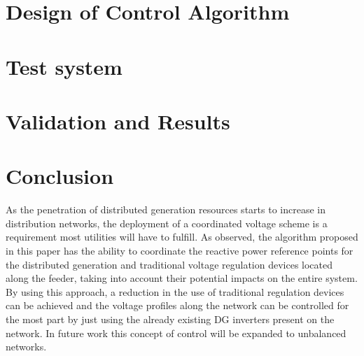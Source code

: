 \documentclass[conference]{IEEEtran}
\begin{document}
\section{Design of Control Algorithm}\label{sec:design}


\section{Test system}


\section{Validation and Results}\label{sec:val}


%

\section{Conclusion}
As the penetration of distributed generation resources starts to increase in distribution networks, the deployment of a coordinated voltage scheme is a requirement most utilities will have to fulfill. As observed, the algorithm proposed in this paper has the ability to coordinate the reactive power reference points for the distributed generation and traditional voltage regulation devices located along the feeder, taking into account their potential impacts on the entire system. By using this approach, a reduction in the use of traditional regulation devices can be achieved and the voltage profiles along the network can be controlled for the most part by just using the already existing DG inverters present on the network. In future work this concept of control will be expanded to unbalanced networks.






\end{document}
